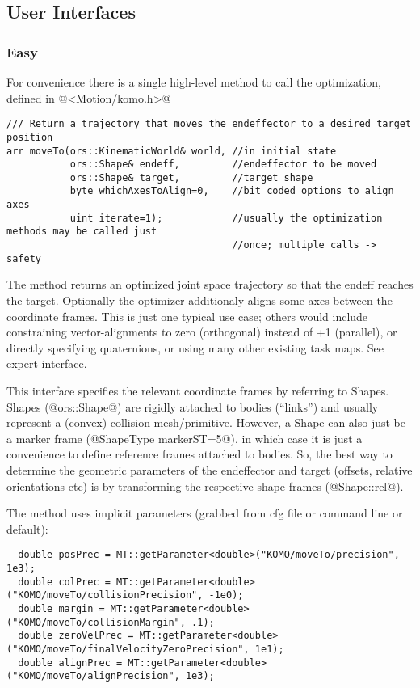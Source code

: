 \documentclass[10pt,fleqn,twoside]{article}
\begin{document}
{{\begin{description}
\end{description}




\subsection{User Interfaces}

\subsubsection{Easy}

For convenience there is a single high-level method to call the
optimization, defined in @<Motion/komo.h>@
\begin{code}
\begin{verbatim}
/// Return a trajectory that moves the endeffector to a desired target position
arr moveTo(ors::KinematicWorld& world, //in initial state
           ors::Shape& endeff,         //endeffector to be moved
           ors::Shape& target,         //target shape
           byte whichAxesToAlign=0,    //bit coded options to align axes
           uint iterate=1);            //usually the optimization methods may be called just
                                       //once; multiple calls -> safety
\end{verbatim}
\end{code}
The method returns an optimized joint space trajectory so that the
endeff reaches the target. Optionally the optimizer additionaly
aligns some axes between the coordinate frames. This is just one
typical use case; others would include constraining vector-alignments
to zero (orthogonal) instead of +1 (parallel), or directly specifying
quaternions, or using many other existing task maps. See expert
interface.

This interface specifies the relevant coordinate frames by referring
to Shapes. Shapes (@ors::Shape@) are rigidly attached to bodies
(``links'') and usually represent a (convex) collision
mesh/primitive. However, a Shape can also just be a marker frame
(@ShapeType markerST=5@), in which case it is just a convenience to
define reference frames attached to bodies. So, the best way to
determine the geometric parameters of the endeffector and target
(offsets, relative orientations etc) is by transforming the respective
shape frames (@Shape::rel@).

The method uses implicit parameters (grabbed from cfg file or command line or default):
\begin{code}
\begin{verbatim}
  double posPrec = MT::getParameter<double>("KOMO/moveTo/precision", 1e3);
  double colPrec = MT::getParameter<double>("KOMO/moveTo/collisionPrecision", -1e0);
  double margin = MT::getParameter<double>("KOMO/moveTo/collisionMargin", .1);
  double zeroVelPrec = MT::getParameter<double>("KOMO/moveTo/finalVelocityZeroPrecision", 1e1);
  double alignPrec = MT::getParameter<double>("KOMO/moveTo/alignPrecision", 1e3);
\end{verbatim}
\end{code}


}}
\end{document}
